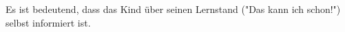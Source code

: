 Es ist bedeutend, dass das Kind über seinen Lernstand ("Das kann ich schon!") selbst informiert ist.